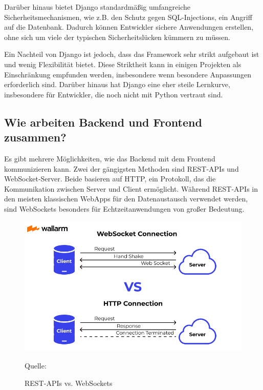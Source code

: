 \documentclass[biblatex]{lni}
\begin{document}
Darüber hinaus bietet Django standardmäßig umfangreiche Sicherheitsmechanismen,
wie z.B. den Schutz gegen \ac{SQL}-Injections, ein Angriff auf die Datenbank.
Dadurch können Entwickler sichere Anwendungen erstellen,
ohne sich um viele der typischen Sicherheitslücken kümmern zu müssen.

Ein Nachteil von Django ist jedoch,
dass das Framework sehr strikt aufgebaut ist und wenig Flexibilität bietet. \cite{MED}
Diese Striktheit kann in einigen Projekten als Einschränkung empfunden werden,
insbesondere wenn besondere Anpassungen erforderlich sind.
Darüber hinaus hat Django eine eher steile Lernkurve, insbesondere für Entwickler, die noch nicht mit Python vertraut sind.

\subsection{Wie arbeiten Backend und Frontend zusammen?}

Es gibt mehrere Möglichkeiten, wie das Backend mit dem Frontend kommunizieren kann.
Zwei der gängigsten Methoden sind \ac{REST}-\ac{API}s und WebSocket-Server.
Beide basieren auf \ac{HTTP}, ein Protokoll, das die Kommunikation zwischen Server und Client ermöglicht.
Während \ac{REST}-\ac{API}s in den meisten klassischen \ac{WebApp}s für den Datenaustausch verwendet werden,
sind WebSockets besonders für Echtzeitanwendungen von großer Bedeutung. \cite{ReSock}

\begin{figure}
  \centering
  \includegraphics[width=.8\textwidth]{communication}
  \caption{REST-APIs vs. WebSockets}
  \label{fig:communication}
  \vspace{-0.3cm}
  \begin{center}
    \footnotesize Quelle: \cite{WebCon}
  \end{center}
\end{figure}
\end{document}
